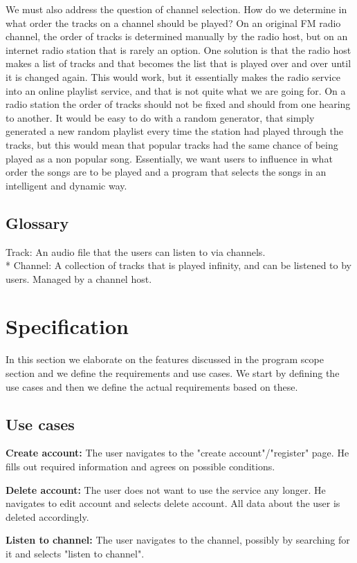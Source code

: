 \documentclass[a4paper,11pt,report]{article}
\begin{document}
{We must also address the question of channel selection. How do we determine in what order the tracks on a channel should be played? On an original FM radio channel, the order of tracks is determined manually by the radio host, but on an internet radio station that is rarely an option. One solution is that the radio host makes a list of tracks and that becomes the list that is played over and over until it is changed again. This would work, but it essentially makes the radio service into an online playlist service, and that is not quite what we are going for. On a radio station the order of tracks should not be fixed and should from one hearing to another. It would be easy to do with a random generator, that simply generated a new random playlist every time the station had played through the tracks, but this would mean that popular tracks had the same chance of being played as a non popular song. Essentially, we want users to influence in what order the songs are to be played and a program that selects the songs in an intelligent and dynamic way. 

\subsection{Glossary}
Track: An audio file that the users can listen to via channels. \\*
Channel: A collection of tracks that is played infinity, and can be listened to by users. Managed by a channel host.

\section{Specification}
In this section we elaborate on the features discussed in the program scope section and we define the requirements and use cases. We start by defining the use cases and then we define the actual requirements based on these. 
\subsection{Use cases}
\textbf{Create account:}
The user navigates to the "create account"/"register" page. He fills out required information and agrees on possible conditions.

\textbf{Delete account:}
The user does not want to use the service any longer. He navigates to edit account and selects delete account. All data about the user is deleted accordingly.

\textbf{Listen to channel:}
The user navigates to the channel, possibly by searching for it and selects "listen to channel".

}
\end{document}

